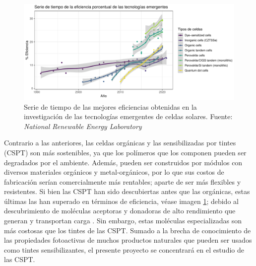 \begin{figure}[h!]
    \begin{center}
        \includegraphics[scale=0.6]{img/emergentes.pdf}
    \end{center}
    \caption{Serie de tiempo de las mejores eficiencias obtenidas en la investigación de las tecnologías emergentes de celdas solares.
    Fuente: \textit{National Renewable Energy Laboratory} \cite{nrel}}
    \label{img:SerieEmergente}
\end{figure}

Contrario a las anteriores, las celdas orgánicas y las sensibilizadas por tintes (CSPT) son más sostenibles, ya que los polímeros que los componen pueden ser degradados por el ambiente. Además, pueden ser construidos por módulos con diversos materiales orgánicos y metal-orgánicos, por lo que sus costos de fabricación serían comercialmente más rentables; aparte de ser más flexibles y resistentes. Si bien las CSPT han sido descubiertas antes que las orgánicas, estas últimas las han superado en términos de eficiencia, véase imagen \ref{img:SerieEmergente}; debido al descubrimiento de moléculas aceptoras y donadoras de alto rendimiento que generan y transportan carga \cite{li2022recent}. Sin embargo, estas moléculas especializadas son más costosas que los tintes de las CSPT. Sumado a la brecha de conocimiento de las propiedades fotoactivas de muchos productos naturales que pueden ser usados como tintes sensibilizantes, el presente proyecto se concentrará en el estudio de las CSPT. 


